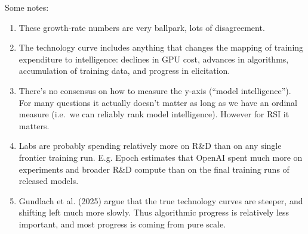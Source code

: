 \documentclass[
  11pt,
  letterpaper,
  DIV=11,
  numbers=noendperiod]{scrartcl}
\providecommand{\tightlist}{%
  \setlength{\itemsep}{0pt}\setlength{\parskip}{0pt}}
\begin{document}
Some notes:

\begin{enumerate}
\def\labelenumi{\arabic{enumi}.}
\tightlist
\item
  These growth-rate numbers are very ballpark, lots of disagreement.
\item
  The technology curve includes anything that changes the mapping of
  training expenditure to intelligence: declines in GPU cost, advances
  in algorithms, accumulation of training data, and progress in
  elicitation.
\item
  There's no consensus on how to measure the y-axis (``model
  intelligence''). For many questions it actually doesn't matter as long
  as we have an ordinal measure (i.e.~we can reliably rank model
  intelligence). However for RSI it matters.
\item
  Labs are probably spending relatively more on R\&D than on any single
  frontier training run. E.g. Epoch estimates that OpenAI spent much
  more on experiments and broader R\&D compute than on the final
  training runs of released models.
\item
  Gundlach et al. (2025) argue that the true technology curves are
  steeper, and shifting left much more slowly. Thus algorithmic progress
  is relatively less important, and most progress is coming from pure
  scale.
\end{enumerate}
\end{document}
